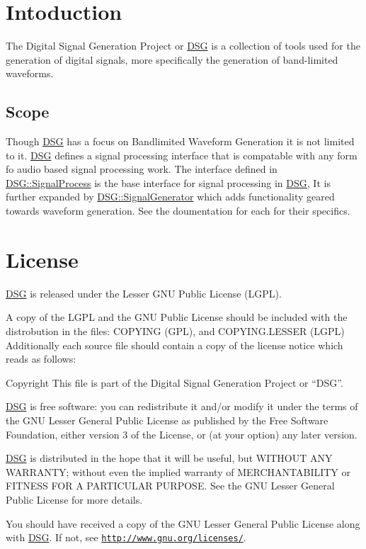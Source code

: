 \hypertarget{index_intro_sec}{}\section{Intoduction}\label{index_intro_sec}
The Digital Signal Generation Project or \hyperlink{namespace_d_s_g}{D\+S\+G} is a collection of tools used for the generation of digital signals, more specifically the generation of band-\/limited waveforms. \hypertarget{index_Scope}{}\subsection{Scope}\label{index_Scope}
Though \hyperlink{namespace_d_s_g}{D\+S\+G} has a focus on Bandlimited Waveform Generation it is not limited to it. \hyperlink{namespace_d_s_g}{D\+S\+G} defines a signal processing interface that is compatable with any form fo audio based signal processing work. The interface defined in \hyperlink{class_d_s_g_1_1_signal_process}{D\+S\+G\+::\+Signal\+Process} is the base interface for signal processing in \hyperlink{namespace_d_s_g}{D\+S\+G}, It is further expanded by \hyperlink{class_d_s_g_1_1_signal_generator}{D\+S\+G\+::\+Signal\+Generator} which adds functionality geared towards waveform generation. See the doumentation for each for their specifics. \hypertarget{index_License}{}\section{License}\label{index_License}
\hyperlink{namespace_d_s_g}{D\+S\+G} is released under the Lesser G\+N\+U Public License (L\+G\+P\+L).

A copy of the L\+G\+P\+L and the G\+N\+U Public License should be included with the distrobution in the files\+: C\+O\+P\+Y\+I\+N\+G (G\+P\+L), and C\+O\+P\+Y\+I\+N\+G.\+L\+E\+S\+S\+E\+R (L\+G\+P\+L) Additionally each source file should contain a copy of the license notice which reads as follows\+: \begin{DoxyCopyright}{Copyright}
This file is part of the Digital Signal Generation Project or “\+D\+S\+G”.
\end{DoxyCopyright}
\hyperlink{namespace_d_s_g}{D\+S\+G} is free software\+: you can redistribute it and/or modify it under the terms of the G\+N\+U Lesser General Public License as published by the Free Software Foundation, either version 3 of the License, or (at your option) any later version.

\hyperlink{namespace_d_s_g}{D\+S\+G} is distributed in the hope that it will be useful, but W\+I\+T\+H\+O\+U\+T A\+N\+Y W\+A\+R\+R\+A\+N\+T\+Y; without even the implied warranty of M\+E\+R\+C\+H\+A\+N\+T\+A\+B\+I\+L\+I\+T\+Y or F\+I\+T\+N\+E\+S\+S F\+O\+R A P\+A\+R\+T\+I\+C\+U\+L\+A\+R P\+U\+R\+P\+O\+S\+E. See the G\+N\+U Lesser General Public License for more details.

You should have received a copy of the G\+N\+U Lesser General Public License along with \hyperlink{namespace_d_s_g}{D\+S\+G}. If not, see \href{http://www.gnu.org/licenses/}{\tt http\+://www.\+gnu.\+org/licenses/}. 
